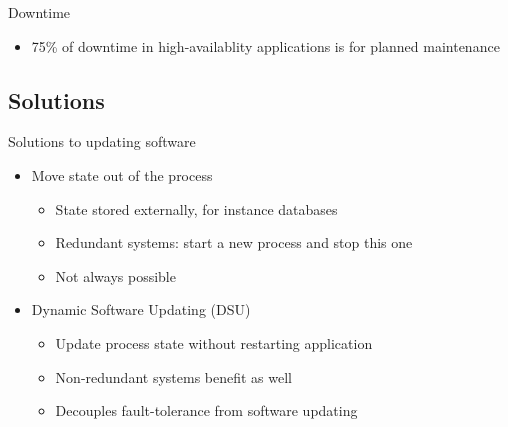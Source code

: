 {
\begin{frame}{Downtime}%
\begin{itemize}
\item 75\% of downtime in high-availablity applications is for planned
maintenance
\end{itemize}
\end{frame}
}

\subsection{Solutions}
\begin{frame}{Solutions to updating software}%
\begin{itemize}
\item Move state out of the process
  \begin{itemize}
  \item State stored externally, for instance databases
  \item Redundant systems: start a new process and stop this one
  \item Not always possible
  \end{itemize}
\item<2-> Dynamic Software Updating (DSU)
  \begin{itemize}
    \item Update process state without restarting application
    \item Non-redundant systems benefit as well
    \item Decouples fault-tolerance from software updating
  \end{itemize}
\end{itemize}
\end{frame}

